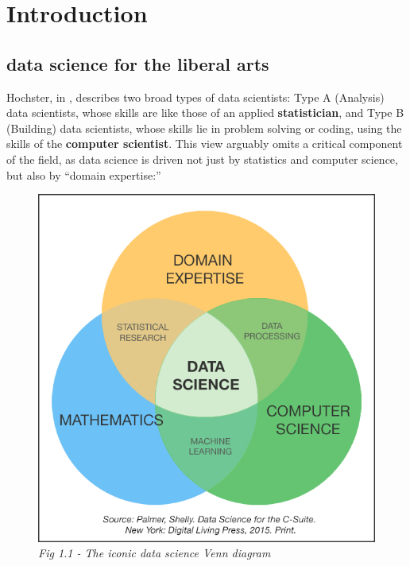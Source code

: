 \documentclass[openany]{book}
\begin{document}
\hypertarget{part-introduction}{%
\part{Introduction}\label{part-introduction}}

\hypertarget{data-science-for-the-liberal-arts}{%
\chapter{data science for the liberal arts}\label{data-science-for-the-liberal-arts}}

Hochster, in \citet{hicks2017guide}, describes two broad types of data scientists: Type A (Analysis) data scientists, whose skills are like those of an applied \textbf{statistician}, and Type B (Building) data scientists, whose skills lie in problem solving or coding, using the skills of the \textbf{computer scientist}. This view arguably omits a critical component of the field, as data science is driven not just by statistics and computer science, but also by ``domain expertise:''

\begin{figure}
\centering
\includegraphics{dataVenn.png}
\caption{\emph{Fig 1.1 - The iconic data science Venn diagram}}
\end{figure}
\end{document}
